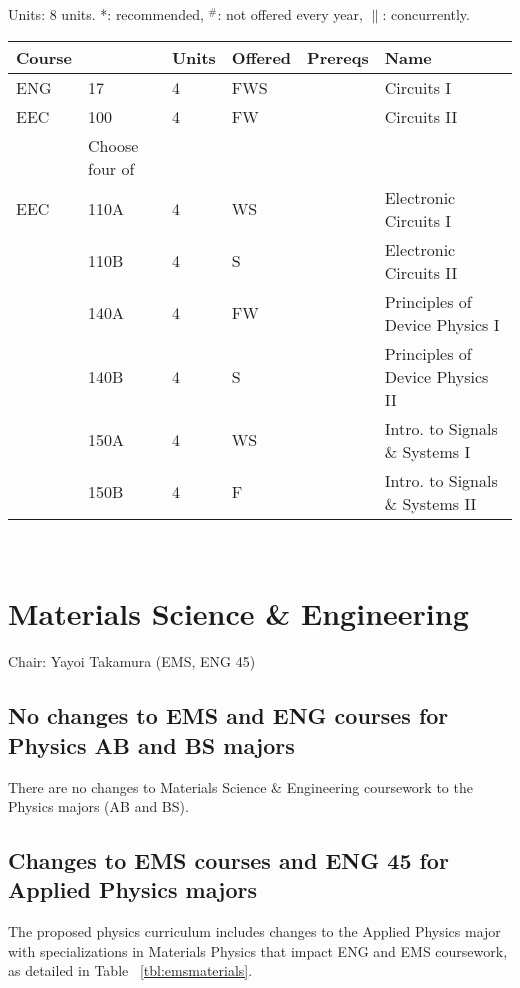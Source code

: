 \documentclass[12pt]{article}
\begin{document}
\vskip 0.25cm
\noindent
Units:  8 units. *: recommended, $^\#$: not offered every year, $\parallel$: concurrently.\\
\begin{tabular}{|llllll|}
\hline
Course & & Units & Offered & Prereqs & Name \\
\hline
ENG & 17     & 4 & FWS & & Circuits I\\
EEC & 100    & 4 & FW & & Circuits II\\
\hline
\hline
    & Choose four of & & & & \\
\hline
EEC & 110A  & 4 & WS & & Electronic Circuits I \\
    & 110B  & 4 & S  & & Electronic Circuits II\\
    & 140A  & 4 & FW & & Principles of Device Physics I\\
    & 140B  & 4 & S  & & Principles of Device Physics II\\
    & 150A  & 4 & WS & & Intro. to Signals \& Systems I\\
    & 150B  & 4 & F  & & Intro. to Signals \& Systems II\\
\hline
\end{tabular}\\

\newpage
\section{Materials Science \& Engineering}
Chair: Yayoi Takamura (EMS, ENG 45)

\subsection{No changes to EMS and ENG courses for Physics AB and BS majors}

There are no changes to Materials Science \& Engineering coursework
to the Physics majors (AB and BS).

\subsection{Changes to EMS courses and ENG 45 for Applied Physics majors}

The proposed physics curriculum includes changes to the Applied
Physics major with specializations in Materials Physics that impact
ENG and EMS coursework, as detailed in Table~ \ref{tbl:emsmaterials}.
\end{document}
